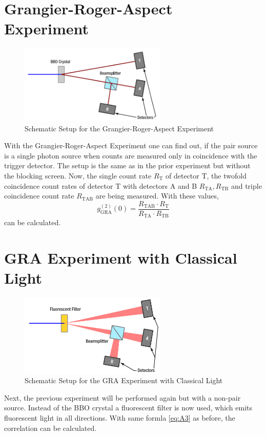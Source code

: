 \section{Grangier-Roger-Aspect Experiment}
\label{GRA}
\begin{figure}[H]
    \centering
    \includegraphics[width=70mm,scale=0.5]{Quantenoptik/include/A3.PNG}
    \caption{ Schematic Setup for the Grangier-Roger-Aspect Experiment} 
    \label{fig:A3}
\end{figure}
With the Grangier-Roger-Aspect Experiment one can find out, if the pair source is a single photon source when counts are measured only in coincidence with the trigger detector. The setup is the same as in the prior experiment but without the blocking screen. Now, the single count rate $R_\text{T}$ of detector T, the twofold coincidence count rates of detector T
with detectors A and B $R_\text{TA}, R_\text{TB}$  and triple coincidence count rate $R_\text{TAB}$ are being measured. With these values, 
\begin{equation}
    g_\text{GRA}^{(2)}(0)=\frac{R_\text{TAB}\cdot R_\text{T}}{R_\text{TA}\cdot R_\text{TB}}
    \label{eq:A3}
\end{equation}
can be calculated. 

\section{GRA Experiment with Classical Light}
\begin{figure}[H]
    \centering
    \includegraphics[width=70mm,scale=0.5]{Quantenoptik/include/A4.PNG}
    \caption{Schematic Setup for the GRA Experiment with Classical Light}
    \label{fig:A4}
\end{figure}
Next, the previous experiment will be performed again but with a non-pair source. Instead of the BBO crystal a fluorescent filter is now used, which emits fluorescent light in all directions. With same formla \ref{eq:A3} as before, the correlation can be calculated. 

